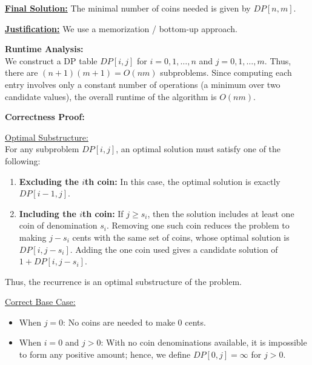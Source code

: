 \documentclass[11pt]{article}
\begin{document}
    \underline{\textbf{Final Solution:}} The minimal number of coins needed is given by \(DP[n,m]\).
    
    \medskip
    
    \underline{\textbf{Justification:}} We use a memorization / bottom-up approach. 

    \textbf{Runtime Analysis:} \\
    We construct a DP table \(DP[i,j]\) for \(i=0,1,\dots,n\) and \(j=0,1,\dots,m\). Thus, there are \((n+1)(m+1)=O(nm)\) subproblems. Since computing each entry involves only a constant number of operations (a minimum over two candidate values), the overall runtime of the algorithm is \(O(nm)\).
    
    \bigskip
    
    \textbf{Correctness Proof:}
    
    \underline{Optimal Substructure:} \\
    For any subproblem \(DP[i,j]\), an optimal solution must satisfy one of the following:
    \begin{enumerate}
        \item \textbf{Excluding the \(i\)th coin:} In this case, the optimal solution is exactly \(DP[i-1,j]\).
        \item \textbf{Including the \(i\)th coin:} If \(j \ge s_i\), then the solution includes at least one coin of denomination \(s_i\). Removing one such coin reduces the problem to making \(j-s_i\) cents with the same set of coins, whose optimal solution is \(DP[i,j-s_i]\). Adding the one coin used gives a candidate solution of \(1 + DP[i,j-s_i]\).
    \end{enumerate}
    Thus, the recurrence is an optimal substructure of the problem.
    
    \medskip
    
    \underline{Correct Base Case:} \\
    \begin{itemize}
        \item When \(j=0\): No coins are needed to make 0 cents.
        \item When \(i=0\) and \(j>0\): With no coin denominations available, it is impossible to form any positive amount; hence, we define \(DP[0,j]=\infty\) for \(j>0\).
    \end{itemize}
    
    \newpage

    
    
\end{document}
